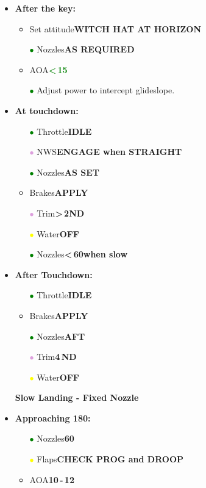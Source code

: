 \documentclass[a4paper,12pt,dvipsnames]{letter}
\newcommand{\button}[1]{\textbf{#1}}
\newcommand{\Deg}{\textdegree{}}
\newcommand{\ok}[1]{\textcolor{Green}{\textbf{#1}}}
\newcommand{\gi}{\textcolor{Green}{$\bullet$\;}}
\newcommand{\yi}{\textcolor{Yellow}{$\bullet$\;}}
\newcommand{\vi}{\textcolor{Plum}{$\bullet$\;}}
\begin{document}
{\begin{itemize}
\begin{itemize}
\end{itemize}
\item \button{After the key:}
\begin{itemize}
 \item Set attitude\dotfill\button{WITCH HAT AT HORIZON}
 \item[\gi] Nozzles\dotfill\button{AS REQUIRED}
 \item AOA\dotfill\ok{<\,15\Deg}
 \item[\gi] Adjust power to intercept glideslope.
\end{itemize}
\item \button{At touchdown:}
\begin{itemize}
 \item[\gi] Throttle\dotfill\button{IDLE}
 \item[\vi] NWS\dotfill\button{ENGAGE when STRAIGHT}
 \item[\gi] Nozzles\dotfill\button{AS SET}
 \item Brakes\dotfill\button{APPLY}
 \item[\vi] Trim\dotfill\button{>\,2\Deg\;ND}
 \item[\yi] Water\dotfill\button{OFF}
 \item[\gi] Nozzles\dotfill\button{<\,60\Deg\;when slow}
\end{itemize}
\item \button{After Touchdown:}
\begin{itemize}
\item[\gi] Throttle\dotfill\button{IDLE}
\item Brakes\dotfill\button{APPLY}
\item[\gi] Nozzles\dotfill\button{AFT}
\item[\vi] Trim\dotfill\button{4\Deg\,ND}
\item[\yi] Water\dotfill\button{OFF}
\end{itemize}
\end{itemize}
\newpage
\begin{itemize}
\item[] {\LARGE\textbf{Slow Landing - Fixed Nozzle}}
\item \button{Approaching 180:}
\begin{itemize}
 \item[\gi] Nozzles\dotfill\button{60\Deg}
 \item[\yi] Flaps\dotfill\button{CHECK PROG and DROOP}
 \item AOA\dotfill\button{10\Deg\,-\,12\Deg}

\end{itemize}
\end{itemize}}
\end{document}

